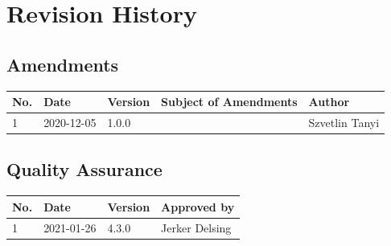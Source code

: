 \documentclass[a4paper]{arrowhead}
\begin{document}
\newpage

\section{Revision History}
\subsection{Amendments}

\noindent\begin{tabularx}{\textwidth}{| p{1cm} | p{3cm} | p{2cm} | X | p{4cm} |} \hline
\rowcolor{gray!33} No. & Date & Version & Subject of Amendments & Author \\ \hline

1 & 2020-12-05 & 1.0.0 & & Szvetlin Tanyi \\ \hline

\end{tabularx}

\subsection{Quality Assurance}

\noindent\begin{tabularx}{\textwidth}{| p{1cm} | p{3cm} | p{2cm} | X |} \hline
\rowcolor{gray!33} No. & Date & Version & Approved by \\ \hline

1 & 2021-01-26  & 4.3.0 & Jerker Delsing\\ \hline

\end{tabularx}
\end{document}
